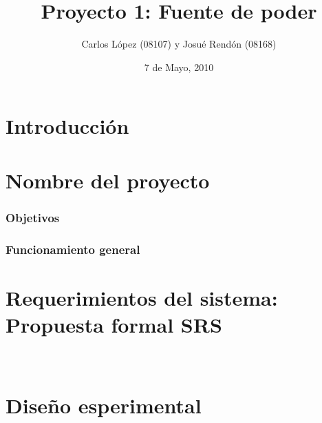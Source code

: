 \documentclass[]{report}   %
\begin{document}
\title{Proyecto 1: Fuente de poder}   %
\author{Carlos L\'{o}pez (08107) y Josu\'{e} Rend\'{o}n (08168)}         %
\date{7 de Mayo, 2010}    %
\maketitle

\begin{abstract}


\end{abstract}

\chapter{Introducci\'{o}n}          

\chapter{Nombre del proyecto}

\subsection{Objetivos}

\subsection{Funcionamiento general}

\chapter{Requerimientos del sistema: Propuesta formal SRS}

\
\chapter{Dise\~{n}o esperimental}     


\begin{thebibliography}{1}

\end{thebibliography}
\end{document}
